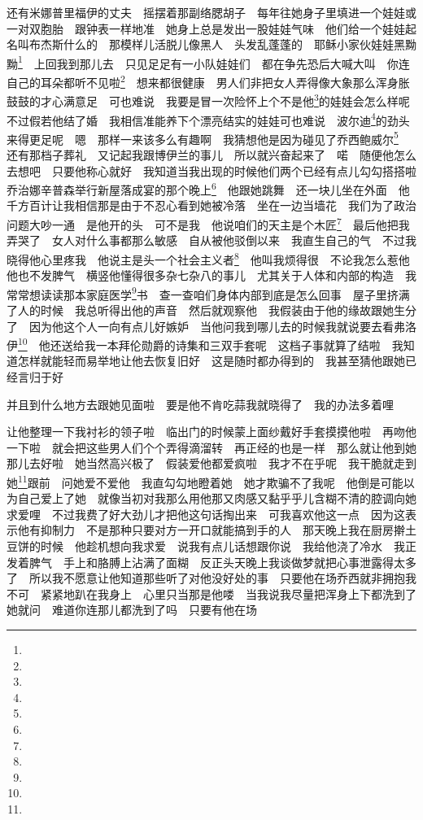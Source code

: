 \par 还有米娜普里福伊的丈夫　摇摆着那副络腮胡子　每年往她身子里填进一个娃娃或一对双胞胎　跟钟表一样地准　她身上总是发出一股娃娃气味　他们给一个娃娃起名叫布杰斯什么的　那模样儿活脱儿像黑人　头发乱蓬蓬的　耶稣小家伙娃娃黑黝黝\footnote{}　上回我到那儿去　只见足足有一小队娃娃们　都在争先恐后大喊大叫　你连自己的耳朵都听不见啦\footnote{}　想来都很健康　男人们非把女人弄得像大象那么浑身胀鼓鼓的才心满意足　可也难说　我要是冒一次险怀上个不是他\footnote{}的娃娃会怎么样呢　不过假若他结了婚　我相信准能养下个漂亮结实的娃娃可也难说　波尔迪\footnote{}的劲头来得更足呢　嗯　那样一来该多么有趣啊　我猜想他是因为碰见了乔西鲍威尔\footnote{}　还有那档子葬礼　又记起我跟博伊兰的事儿　所以就兴奋起来了　喏　随便他怎么去想吧　只要他称心就好　我知道当我出现的时候他们两个已经有点儿勾勾搭搭啦　乔治娜辛普森举行新屋落成宴的那个晚上\footnote{}　他跟她跳舞　还一块儿坐在外面　他千方百计让我相信那是由于不忍心看到她被冷落　坐在一边当墙花　我们为了政治问题大吵一通　是他开的头　可不是我　他说咱们的天主是个木匠\footnote{}　最后他把我弄哭了　女人对什么事都那么敏感　自从被他驳倒以来　我直生自己的气　不过我晓得他心里疼我　他说主是头一个社会主义者\footnote{}　他叫我烦得很　不论我怎么惹他　他也不发脾气　横竖他懂得很多杂七杂八的事儿　尤其关于人体和内部的构造　我常常想读读那本家庭医学\footnote{}书　查一查咱们身体内部到底是怎么回事　屋子里挤满了人的时候　我总听得出他的声音　然后就观察他　我假装由于他的缘故跟她生分了　因为他这个人一向有点儿好嫉妒　当他问我到哪儿去的时候我就说要去看弗洛伊\footnote{}　他还送给我一本拜伦勋爵的诗集和三双手套呢　这档子事就算了结啦　我知道怎样就能轻而易举地让他去恢复旧好　这是随时都办得到的　我甚至猜他跟她已经言归于好　
\par 并且到什么地方去跟她见面啦　要是他不肯吃蒜我就晓得了　我的办法多着哩　
\par 让他整理一下我衬衫的领子啦　临出门的时候蒙上面纱戴好手套摸摸他啦　再吻他一下啦　就会把这些男人们个个弄得滴溜转　再正经的也是一样　那么就让他到她那儿去好啦　她当然高兴极了　假装爱他都爱疯啦　我才不在乎呢　我干脆就走到她\footnote{}跟前　问她爱不爱他　我直勾勾地瞪着她　她才欺骗不了我呢　他倒是可能以为自己爱上了她　就像当初对我那么用他那又肉感又黏乎乎儿含糊不清的腔调向她求爱哩　不过我费了好大劲儿才把他这句话掏出来　可我喜欢他这一点　因为这表示他有抑制力　不是那种只要对方一开口就能搞到手的人　那天晚上我在厨房擀土豆饼的时候　他趁机想向我求爱　说我有点儿话想跟你说　我给他浇了冷水　我正发着脾气　手上和胳膊上沾满了面糊　反正头天晚上我谈做梦就把心事泄露得太多了　所以我不愿意让他知道那些听了对他没好处的事　只要他在场乔西就非拥抱我不可　紧紧地趴在我身上　心里只当那是他喽　当我说我尽量把浑身上下都洗到了　她就问　难道你连那儿都洗到了吗　只要有他在场　
